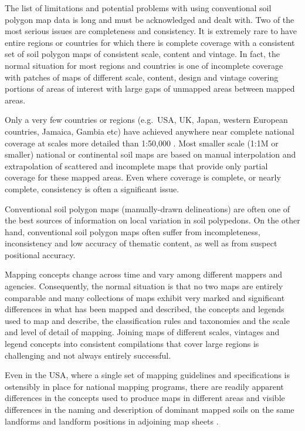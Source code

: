 \documentclass[graybox,natbib,nospthms,UStrade]{svmono}
\let\BeginKnitrBlock\begin \let\EndKnitrBlock\end
\let\BeginKnitrBlock\begin \let\EndKnitrBlock\end
\begin{document}
The list of limitations and potential problems with using conventional
soil polygon map data is long and must be acknowledged and dealt with.
Two of the most serious issues are completeness and consistency. It is
extremely rare to have entire regions or countries for which there is
complete coverage with a consistent set of soil polygon maps of
consistent scale, content and vintage. In fact, the normal situation for
most regions and countries is one of incomplete coverage with patches of
maps of different scale, content, design and vintage covering portions
of areas of interest with large gaps of unmapped areas between mapped
areas.

Only a very few countries or regions (e.g.~USA, UK, Japan, western
European countries, Jamaica, Gambia etc) have achieved anywhere near
complete national coverage at scales more detailed than 1:50,000
\citep{Rossiter2004SUM, Hartemink2008SMD}. Most smaller scale (1:1M or
smaller) national or continental soil maps are based on manual
interpolation and extrapolation of scattered and incomplete maps that
provide only partial coverage for these mapped areas. Even where
coverage is complete, or nearly complete, consistency is often a
significant issue.

\BeginKnitrBlock{rmdnote}
Conventional soil polygon maps (manually-drawn
delineations) are often one of the best sources of information on local
variation in soil polypedons. On the other hand, conventional soil
polygon maps often suffer from incompleteness, inconsistency and low
accuracy of thematic content, as well as from suspect positional accuracy.
\EndKnitrBlock{rmdnote}

Mapping concepts change across time and vary among different mappers and
agencies. Consequently, the normal situation is that no two maps are
entirely comparable and many collections of maps exhibit very marked and
significant differences in what has been mapped and described, the
concepts and legends used to map and describe, the classification rules
and taxonomies and the scale and level of detail of mapping. Joining
maps of different scales, vintages and legend concepts into consistent
compilations that cover large regions is challenging and not always
entirely successful.

Even in the USA, where a single set of mapping guidelines and
specifications is ostensibly in place for national mapping programs,
there are readily apparent differences in the concepts used to produce
maps in different areas and visible differences in the naming and
description of dominant mapped soils on the same landforms and landform
positions in adjoining map sheets \citep{LathropJr19951, ZHONG2011491}.
\end{document}
